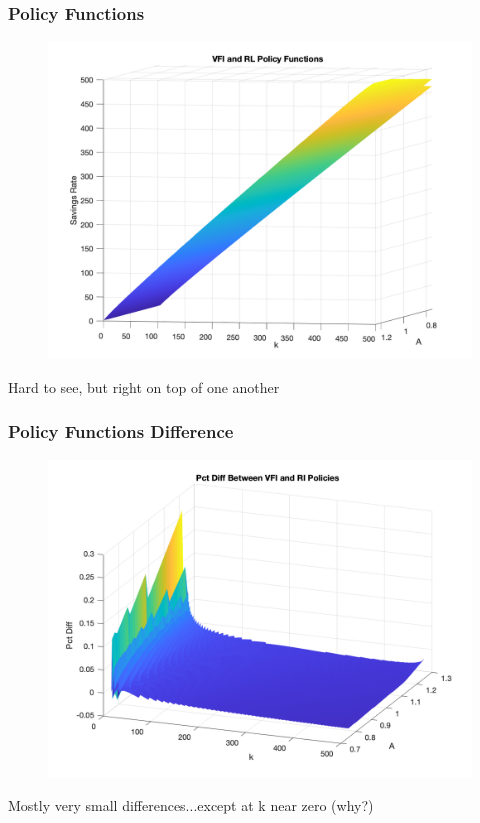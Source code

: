 \documentclass{beamer}
\begin{document}
\begin{frame}
\frametitle[alignment=center]{Policy Functions}
\begin{figure}
\centering
\includegraphics[scale=0.25]{Fig2.png}
\end{figure}
Hard to see, but right on top of one another
\end{frame}

\begin{frame}
\frametitle[alignment=center]{Policy Functions Difference}
\begin{figure}
\centering
\includegraphics[scale=0.25]{Fig3.png}
\end{figure}
Mostly very small differences...except at k near zero (why?)
\end{frame}
\end{document}
